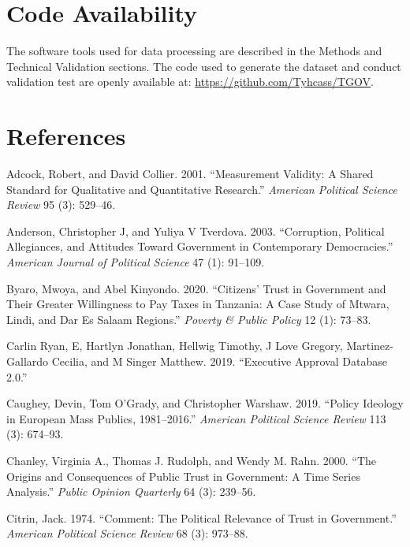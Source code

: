 \documentclass[
  12pt,
]{article}
\newlength{\cslhangindent}
\newenvironment{CSLReferences}[2] %
 {\begin{list}{}{%
  \setlength{\itemindent}{0pt}
  \setlength{\leftmargin}{0pt}
  \setlength{\parsep}{0pt}
  \ifodd #1
   \setlength{\leftmargin}{\cslhangindent}
   \setlength{\itemindent}{-1\cslhangindent}
  \fi
  \setlength{\itemsep}{#2\baselineskip}}}
 {\end{list}}
\begin{document}
\section{Code Availability}\label{code-availability}

The software tools used for data processing are described in the Methods and Technical Validation sections.
The code used to generate the dataset and conduct validation test are openly available at: \url{https://github.com/Tyhcass/TGOV}.

\section*{References}\label{references}

\label{refs-text}
\begin{CSLReferences}{1}{0}
Adcock, Robert, and David Collier. 2001. {``Measurement Validity: A Shared Standard for Qualitative and Quantitative Research.''} \emph{American Political Science Review} 95 (3): 529--46.

Anderson, Christopher J, and Yuliya V Tverdova. 2003. {``Corruption, Political Allegiances, and Attitudes Toward Government in Contemporary Democracies.''} \emph{American Journal of Political Science} 47 (1): 91--109.

Byaro, Mwoya, and Abel Kinyondo. 2020. {``Citizens' Trust in Government and Their Greater Willingness to Pay Taxes in Tanzania: A Case Study of Mtwara, Lindi, and Dar Es Salaam Regions.''} \emph{Poverty \& Public Policy} 12 (1): 73--83.

Carlin Ryan, E, Hartlyn Jonathan, Hellwig Timothy, J Love Gregory, Martinez-Gallardo Cecilia, and M Singer Matthew. 2019. {``Executive Approval Database 2.0.''}

Caughey, Devin, Tom O'Grady, and Christopher Warshaw. 2019. {``Policy Ideology in European Mass Publics, 1981--2016.''} \emph{American Political Science Review} 113 (3): 674--93.

Chanley, Virginia A., Thomas J. Rudolph, and Wendy M. Rahn. 2000. {``The {Origins} and {Consequences} of {Public} {Trust} in {Government}: {A} {Time} {Series} {Analysis}.''} \emph{Public Opinion Quarterly} 64 (3): 239--56.

Citrin, Jack. 1974. {``Comment: The Political Relevance of Trust in Government.''} \emph{American Political Science Review} 68 (3): 973--88.


\end{CSLReferences}
\end{document}
